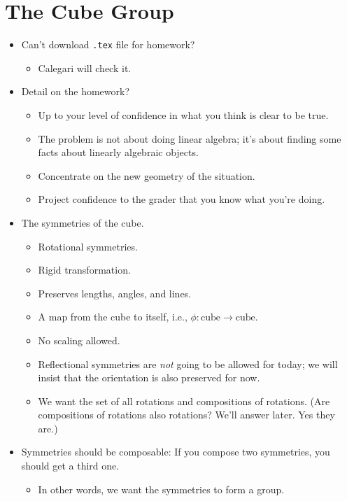\documentclass[../notes.tex]{subfiles}
\begin{document}
\section{The Cube Group}
\begin{itemize}
    \item {}Can't download \verb|.tex| file for homework?
    \begin{itemize}
        \item Calegari will check it.
    \end{itemize}
    \item Detail on the homework?
    \begin{itemize}
        \item Up to your level of confidence in what you think is clear to be true.
        \item The problem is not about doing linear algebra; it's about finding some facts about linearly algebraic objects.
        \item Concentrate on the new geometry of the situation.
        \item Project confidence to the grader that you know what you're doing.
    \end{itemize}
    \item The symmetries of the cube.
    \begin{itemize}
        \item Rotational symmetries.
        \item Rigid transformation.
        \item Preserves lengths, angles, and lines.
        \item A map from the cube to itself, i.e., $\phi:\text{cube}\to\text{cube}$.
        \item No scaling allowed.
        \item Reflectional symmetries are \emph{not} going to be allowed for today; we will insist that the orientation is also preserved for now.
        \item We want the set of all rotations and compositions of rotations. (Are compositions of rotations also rotations? We'll answer later. Yes they are.)
    \end{itemize}
    \item Symmetries should be composable: If you compose two symmetries, you should get a third one.
    \begin{itemize}
        \item In other words, we want the symmetries to form a group.
    \end{itemize}

\end{itemize}
\end{document}
